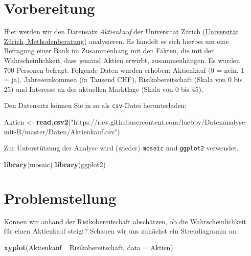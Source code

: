 \documentclass[12pt,]{book}
\newenvironment{Shaded}{\begin{snugshade}}{\end{snugshade}}
\newcommand{\KeywordTok}[1]{\textcolor[rgb]{0.13,0.29,0.53}{\textbf{{#1}}}}
\newcommand{\DataTypeTok}[1]{\textcolor[rgb]{0.13,0.29,0.53}{{#1}}}
\newcommand{\StringTok}[1]{\textcolor[rgb]{0.31,0.60,0.02}{{#1}}}
\newcommand{\NormalTok}[1]{{#1}}
\begin{document}
\section{Vorbereitung}\label{vorbereitung}

Hier werden wir den Datensatz \emph{Aktienkauf} der Universität Zürich
(\href{http://www.methodenberatung.uzh.ch/de/datenanalyse/zusammenhaenge/lreg.html}{Universität
Zürich, Methodenberatung}) analysieren. Es handelt es sich hierbei um
eine Befragung einer Bank im Zusammenhang mit den Fakten, die mit der
Wahrscheinlichkeit, dass jemand Aktien erwirbt, zusammenhängen. Es
wurden 700 Personen befragt. Folgende Daten wurden erhoben: Aktienkauf
(0 = nein, 1 = ja), Jahreseinkommen (in Tausend CHF), Risikobereitschaft
(Skala von 0 bis 25) und Interesse an der aktuellen Marktlage (Skala von
0 bis 45).

Den Datensatz können Sie in so als \texttt{csv}-Datei herunterladen:

\begin{Shaded}
\begin{Highlighting}[]
\NormalTok{Aktien <-}\StringTok{ }\KeywordTok{read.csv2}\NormalTok{(}\StringTok{"https://raw.githubusercontent.com/luebby/Datenanalyse-mit-R/master/Daten/Aktienkauf.csv"}\NormalTok{)}
\end{Highlighting}
\end{Shaded}

Zur Unterstützung der Analyse wird (wieder) \texttt{mosaic} und
\texttt{ggplot2} verwendet.

\begin{Shaded}
\begin{Highlighting}[]
\KeywordTok{library}\NormalTok{(mosaic)}
\KeywordTok{library}\NormalTok{(ggplot2)}
\end{Highlighting}
\end{Shaded}

\section{Problemstellung}\label{problemstellung}

Können wir anhand der Risikobereitschaft abschätzen, ob die
Wahrscheinlichkeit für einen Aktienkauf steigt? Schauen wir uns zunächst
ein Streudiagramm an:

\begin{Shaded}
\begin{Highlighting}[]
\KeywordTok{xyplot}\NormalTok{(Aktienkauf ~}\StringTok{ }\NormalTok{Risikobereitschaft, }\DataTypeTok{data =} \NormalTok{Aktien)}
\end{Highlighting}
\end{Shaded}
\end{document}
